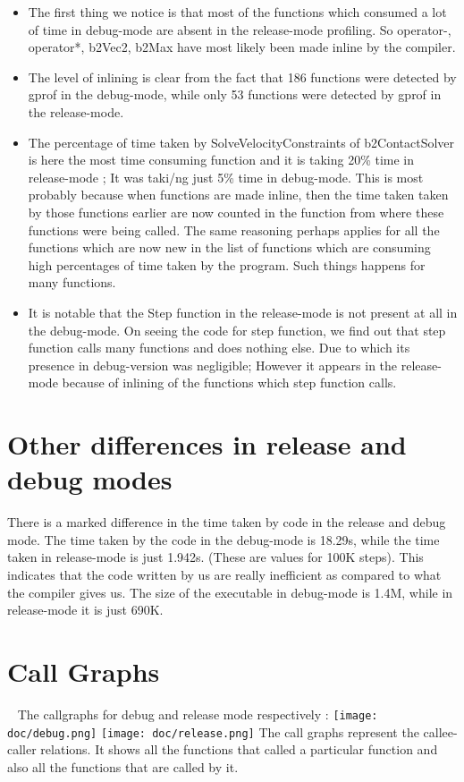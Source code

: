 \documentclass[english]{article}
\begin{document}
\begin{itemize}
\item The first thing we notice is that most of the functions which consumed a lot of time in debug-mode are absent in the release-mode profiling. So operator-, operator*, b2Vec2, b2Max have most likely been made inline by the compiler.
\item The level of inlining is clear from the fact that 186 functions were detected by gprof in the debug-mode, while only 53 functions were detected by gprof in the release-mode.
\item The percentage of time taken by SolveVelocityConstraints of b2ContactSolver is here the most time consuming function and it is taking 20\% time in release-mode ; It was taki/ng just 5\% time in debug-mode. This is most probably because when functions are made inline, then the time taken taken by those functions earlier are now counted in the function from where these functions were being called. The same reasoning perhaps applies for all the functions which are now new in the list of functions which are consuming high percentages of time taken by the program. Such things happens for many functions.
\item It is notable that the Step function in the release-mode is not present at all in the debug-mode. On seeing the code for step function, we find out that step function calls many functions and does nothing else. Due to which its presence in debug-version was negligible; However it appears in the release-mode because of inlining of the functions which step function calls.
\end{itemize} 

\section{Other differences in release and debug modes}
There is a marked difference in the time taken by code in the release and debug mode. The time taken by the code in the debug-mode is 18.29s, while the time taken in release-mode is just 1.942s. (These are values for 100K steps). This indicates that the code written by us are really inefficient as compared to what the compiler gives us.
\newline
The size of the executable in debug-mode is 1.4M, while in release-mode it is just 690K. 


\section{Call Graphs }
~\cite{Gprof2Dot}
The callgraphs for debug and release mode respectively :
\newline
\texttt{[image: doc/debug.png]}
\newline
\newline
\texttt{[image: doc/release.png]}
\newline
The call graphs represent the callee-caller relations. It shows all the functions that called a particular function 
and also all the functions that are called by it.
\end{document}
